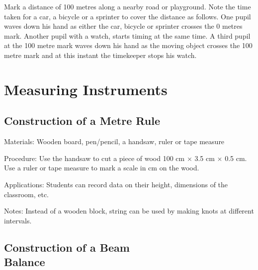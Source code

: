 \begin{multicols}{2}
Mark a distance of 100 metres along a nearby road or playground. Note the time taken for a
car, a bicycle or a sprinter to cover the distance as follows. One pupil waves down his hand
as either the car, bicycle or sprinter crosses the 0 metres mark. Another pupil with a watch,
starts timing at the same time. A third pupil at the 100 metre mark waves down his hand as
the moving object crosses the 100 metre mark and at this instant the timekeeper stops his
watch.

\vfill
\columnbreak



\section*{Measuring Instruments}


\subsection{Construction of a Metre Rule}
\label{sub:metrerule}

\begin{description*}
\item[Materials:]{Wooden board, pen\slash pencil, a handsaw, ruler or tape measure}
\item[Procedure:]{Use the handsaw to cut a piece of wood 100 cm $\times$ 3.5 cm $\times$ 0.5 cm. Use a ruler or tape measure to mark a scale in cm on the wood.}
\item[Applications:]{Students can record data on their height, dimensions of the classroom, etc.}
\item[Notes:]{Instead of a wooden block, string can be used by making knots at different intervals.}
\end{description*}

\subsection[Construction of a Beam Balance]{Construction of a Beam \hfill \\ Balance}
\label{sub:beambalance}


\end{multicols}
